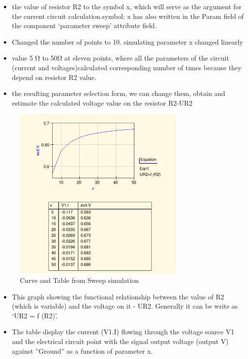 \documentclass{report}
\begin{document}
\begin{itemize}
\item the value of resistor R2 to the symbol x, which will serve as the argument for the
current circuit calculation.\newline symbol: x has also written in the Param field of the
component ‘parameter sweep’ attribute field.\newline
\hfill \break
\item Changed the number of points to 10. simulating parameter x  changed linearly\newline
\hfill \break
\item value 5 Ω to 50Ω at eleven points, where all the parameters of the circuit (current
and voltages)calculated corresponding number of times because they depend on
resistor R2 value.\newline
\hfill \break
\item the resulting parameter selection form, we can change them, obtain and estimate
the calculated voltage value on the resistor R2-UR2
\end{itemize}
\clearpage
\begin{figure}[h]
\centering
\includegraphics[]{02dpi.png}
\caption{Curve and Table from Sweep simulation}
\end{figure}
\begin{itemize}

\item This graph showing the
functional relationship between the value of R2 (which is variable) and the voltage on it -
UR2. Generally it can be write as ‘UR2 = f (R2)’.\newline
\hfill \break
\item The table
display the current (V1.I) flowing through the voltage source V1 and the electrical circuit
point with the signal output voltage (output V) against ”Ground” as a function of parameter
x.
\end{itemize}
\newpage
\end{document}

